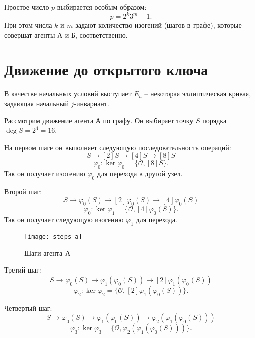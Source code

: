 Простое число $p$ выбирается особым образом:
\begin{equation*}
	p = 2^k 3^m - 1.
\end{equation*}
При этом числа $k$ и $m$ задают количество изогений (шагов в графе), которые совершат агенты А и Б, соответственно.

\section{Движение до открытого ключа}

В качестве начальных условий выступает $E_a$ -- некоторая эллиптическая кривая, задающая начальный $j$-инвариант.

Рассмотрим движение агента А по графу. Он выбирает точку $S$ порядка $\deg S = 2^4 = 16$.

На первом шаге он выполняет следующую последовательность операций:
\begin{equation*}
	S \rightarrow [2]S \rightarrow [4]S \rightarrow [8]S
\end{equation*}
\begin{equation*}
	\varphi_0: \ker \varphi_0 = \{ \mathcal{O}, [8]S \}.
\end{equation*}
Так он получает изогению $\varphi_0$ для перехода в другой узел.

Второй шаг:
\begin{equation*}
	S \rightarrow \varphi_0(S) \rightarrow [2] \varphi_0(S) \rightarrow [4] \varphi_0(S)
\end{equation*}
\begin{equation*}
	\varphi_0: \ker \varphi_1 = \{ \mathcal{O}, [4]\varphi_0(S) \}.
\end{equation*}
Так он получает следующую изогению $\varphi_1$ для перехода.

\begin{figure}[ht]
	\centering
	\texttt{[image: steps\_a]}
	\caption{Шаги агента А}
	\label{fig:steps_a}
\end{figure}

Третий шаг:
\begin{equation*}
	S \rightarrow \varphi_0(S) \rightarrow \varphi_1(\varphi_0(S)) \rightarrow [2] \varphi_1(\varphi_0(S))
\end{equation*}
\begin{equation*}
	\varphi_2: \ker \varphi_2 = \{ \mathcal{O}, [2]\varphi_1(\varphi_0(S)) \}.
\end{equation*}

Четвертый шаг:
\begin{equation*}
	S \rightarrow \varphi_0(S) \rightarrow \varphi_1(\varphi_0(S)) \rightarrow \varphi_2(\varphi_1(\varphi_0(S)))
\end{equation*}
\begin{equation*}
	\varphi_3: \ker \varphi_3 = \{ \mathcal{O}, \varphi_2(\varphi_1(\varphi_0(S))) \}.
\end{equation*}

